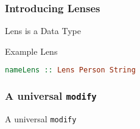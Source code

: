 \begin{frame}[fragile]
\frametitle{Introducing Lenses}

\begin{block}{Lens is a Data Type}

\end{block}
\begin{block}{Example Lens}
\begin{lstlisting}[language=haskell]
nameLens :: Lens Person String
\end{lstlisting}
\end{block}

\end{frame}

\begin{frame}[fragile]
\frametitle{A universal \lstinline$modify$}

\begin{block}{A universal \lstinline$modify$}

\end{block}

\end{frame}

